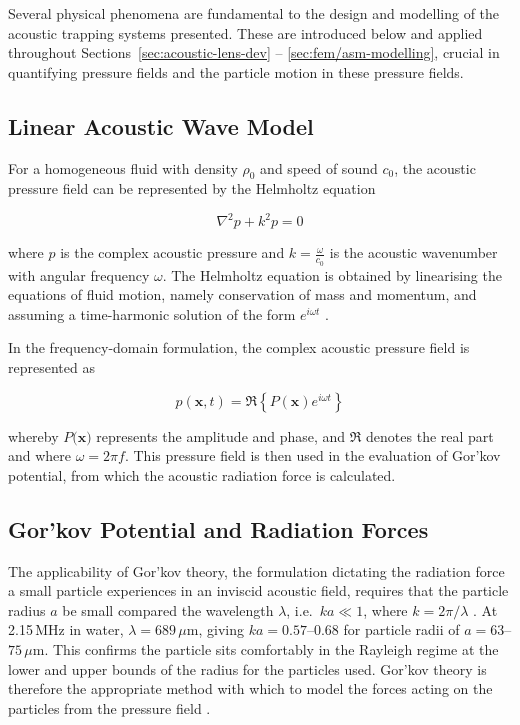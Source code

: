 \documentclass[11pt,a4paper]{article}
\begin{document}
Several physical phenomena are fundamental to the design and modelling of the acoustic trapping systems presented. These are introduced below and applied throughout Sections~\ref{sec:acoustic-lens-dev} -- \ref{sec:fem/asm-modelling}, crucial in quantifying pressure fields and the particle motion in these pressure fields. 


\label{sec:gov-physics}

\subsection{Linear Acoustic Wave Model}
\label{subsec:linear-acoustics}

For a homogeneous fluid with density $\rho_0$ and speed of sound $c_0$, the acoustic pressure field can be represented by the Helmholtz equation

\begin{equation}
\nabla^2 p + k^2 p = 0
\label{eq:helmholtz}
\end{equation}

\noindent where $p$ is the complex acoustic pressure and $k = \frac{\omega}{c_0}$ is the acoustic wavenumber with angular frequency $\omega$. The Helmholtz equation is obtained by linearising the equations of fluid motion, namely conservation of mass and momentum, and assuming a time-harmonic solution of the form $e^{i \omega t}$ \cite{kinsler2000acoustics, ihlenburg1998finite}. 

In the frequency-domain formulation, the complex acoustic pressure field is represented as 

\begin{equation}
p(\mathbf{x},t)=\Re\!\left\{P(\mathbf{x})e^{i\omega t}\right\}
\label{eq:complex-pressure}
\end{equation}

\noindent whereby $P(\mathbf{x)}$ represents the amplitude and phase, and $\Re{}$ denotes the real part and where $\omega = 2\pi f$. This pressure field is then used in the evaluation of Gor'kov potential, from which the acoustic radiation force is calculated. 

\subsection{Gor’kov Potential and Radiation Forces}
\label{subsec:gorkov}


The applicability of Gor'kov theory, the formulation dictating the radiation force a small particle experiences in an inviscid acoustic field, requires that the particle radius $a$ be small compared the wavelength $\lambda$, i.e.\ $ka \ll 1$, where
$k = 2\pi/\lambda$ \cite{gorkov1962, bruus2012radiationforce}. At 2.15\,MHz in water, $\lambda = 689\,\mu\mathrm{m}$,
giving $ka = 0.57$--$0.68$ for particle radii of
$a = 63$--$75\,\mu\mathrm{m}$. This confirms the particle sits comfortably in the Rayleigh regime at the lower and upper bounds of the radius for the particles used. Gor'kov theory is therefore the appropriate method with which to model the forces acting on the particles from the pressure field  \cite{settnes2012forces}. 
\end{document}
